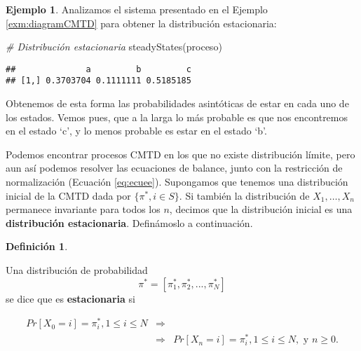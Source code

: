 \documentclass[
]{book}
\newenvironment{Shaded}{\begin{snugshade}}{\end{snugshade}}
\newcommand{\CommentTok}[1]{\textcolor[rgb]{0.56,0.35,0.01}{\textit{#1}}}
\newcommand{\FunctionTok}[1]{\textcolor[rgb]{0.00,0.00,0.00}{#1}}
\newcommand{\NormalTok}[1]{#1}
\newenvironment{yellowbox}{
  \definecolor{shadecolor}{rgb}{210, 180, 140}  
  \color{black}
  \begin{shaded}}
 {\end{shaded}}
\theoremstyle{definition}
\newtheorem{definition}{Definición}[chapter]
\theoremstyle{definition}
\newtheorem{example}{Ejemplo}[chapter]
\theoremstyle{definition}
\theoremstyle{definition}
\theoremstyle{remark}
\begin{document}
\begin{example}
Analizamos el sistema presentado en el Ejemplo \ref{exm:diagramCMTD} para obtener la distribución estacionaria:

\begin{Shaded}
\begin{Highlighting}[]
\CommentTok{\# Distribución estacionaria}
\FunctionTok{steadyStates}\NormalTok{(proceso)}
\end{Highlighting}
\end{Shaded}

\begin{verbatim}
##              a         b         c
## [1,] 0.3703704 0.1111111 0.5185185
\end{verbatim}

Obtenemos de esta forma las probabilidades asintóticas de estar en cada uno de los estados. Vemos pues, que a la larga lo más probable es que nos encontremos en el estado `c', y lo menos probable es estar en el estado `b'.
\end{example}

Podemos encontrar procesos CMTD en los que no existe distribución límite, pero aun así podemos resolver las ecuaciones de balance, junto con la restricción de normalización (Ecuación \eqref{eq:ecuee}). Supongamos que tenemos una distribución inicial de la CMTD dada por \(\{\pi^*, i \in S\}\). Si también la distribución de \(X_1, \ldots, X_n\) permanece invariante para todos los \(n\), decimos que la distribución inicial es una \textbf{distribución estacionaria}. Definámoslo a continuación.

\begin{yellowbox}

\begin{definition}
\protect\hypertarget{def:steadystatedist}{}\label{def:steadystatedist}

Una distribución de probabilidad \[\pi^* = [\pi_1^*, \pi_2^*,...,\pi_N^*]\] se dice que es \textbf{estacionaria} si

\begin{eqnarray*}
Pr[X_0 = i] = \pi_i^*,  1 \leq i \leq N &\Rightarrow& \\
&\Rightarrow& Pr[X_n = i] = \pi_i^*, 1 \leq i \leq N, \text{ y } n \geq 0.
\end{eqnarray*}

\end{definition}

\end{yellowbox}
\end{document}
